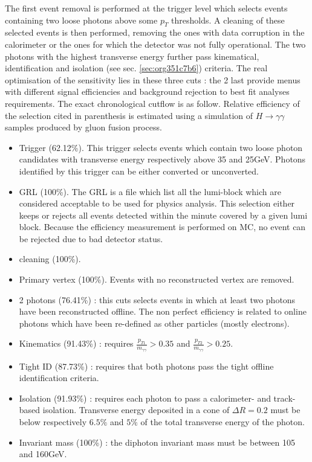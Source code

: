 The first event removal is performed at the trigger level which selects events containing two loose photons above some $p_T$ thresholds.
A cleaning of these selected events is then performed, removing the ones with data corruption in the calorimeter or the ones for which the detector was not fully operational.
The two photons with the highest transverse energy further pass kinematical, identification and isolation (see sec. \ref{sec:org351c7b6}) criteria.
The real optimisation of the sensitivity lies in these three cuts : the 2 last provide menus with different signal efficiencies and background rejection to best fit analyses requirements.
The exact chronological cutflow is as follow.
Relative efficiency of the selection cited in parenthesis is estimated using a simulation of $H\rightarrow\gamma\gamma$ samples produced by gluon fusion process.

\begin{itemize}
\item Trigger  (62.12\%).
This trigger selects events which contain two loose photon candidates with transverse energy respectively above 35 and 25GeV.
Photons identified by this trigger can be either converted or unconverted.

\item GRL (100\%).
The GRL is a file which list all the lumi-block which are considered acceptable to be used for physics analysis.
This selection either keeps or rejects all events detected within the minute covered by a given lumi block.
Because the efficiency measurement is performed on MC, no event can be rejected due to bad detector status.
\item cleaning (100\%).
\item Primary vertex (100\%).
Events with no reconstructed vertex are removed.
\item 2 photons (76.41\%) : this cuts selects events in which at least two photons have been reconstructed offline.
  The non perfect efficiency is related to online photons which have been re-defined as other particles (mostly electrons).
\item Kinematics (91.43\%) : requires $\frac{p_{T1}}{m_{\gamma\gamma}}>0.35$ and $\frac{p_{T2}}{m_{\gamma\gamma}}>0.25$.
\item Tight ID (87.73\%) : requires that both photons pass the tight offline identification criteria.
\item Isolation (91.93\%) : requires each photon to pass a calorimeter- and track-based isolation.
Transverse energy deposited in a cone of $\Delta R=0.2$ must be below respectively $6.5\%$ and $5\%$ of the total transverse energy of the photon.
\item Invariant mass (100\%) : the diphoton invariant mass must be between 105 and 160GeV.
\end{itemize}

